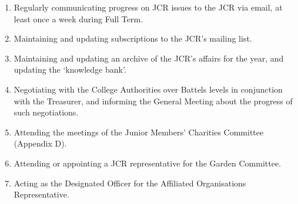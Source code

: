 \begin{enumerate}
	\item Regularly communicating progress on JCR issues to the JCR via email, at least once a week during Full Term.
	\item Maintaining and updating subscriptions to the JCR's mailing list.
	\item Maintaining and updating an archive of the JCR's affairs for the year, and updating the `knowledge bank'.
	\item Negotiating with the College Authorities over Battels levels in conjunction with the Treasurer, and informing the General Meeting about the progress of such negotiations.
	\item Attending the meetings of the Junior Members' Charities Committee (Appendix D).
	\item Attending or appointing a JCR representative for the Garden Committee.
	\item Acting as the Designated Officer for the Affiliated Organisations Representative.
\end{enumerate}
